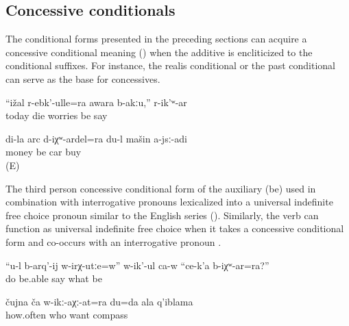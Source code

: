 
\subsection{Concessive conditionals}
\label{sec:concessiveconditionals}

The conditional forms presented in the preceding sections can acquire a concessive conditional meaning () when the additive is encliticized to the conditional suffixes. For instance, the realis conditional  or the past conditional  can serve as the base for concessives.
%
\begin{exe}
	\ex	\label{ex:‎‎‎Even if I die today, I am not worried, she said}
	\gll	``ižal	r-ebk'-ulle=ra	awara	b-akːu,''	r-ik'ʷ-ar\\
		today	die	worries	be	say\\
	\glt	{}

	\ex	\label{ex:‎‎Even if I had money, I would not buy a car}
	\gll	di-la	arc	d-iχʷ-ardel=ra		du-l	mašin	a-jsː-adi\\
			money	be		car	buy\\
	\glt	{} (E)
\end{exe}

The third person concessive conditional form of the auxiliary  (be) used in combination with interrogative pronouns lexicalized into a universal indefinite free choice pronoun similar to the English  series  (). Similarly, the verb   can function as universal indefinite free choice when it takes a concessive conditional form and co-occurs with an interrogative pronoun .
%
\begin{exe}
	\ex	\label{ex:Are you able to do whatever? he says}
	\gll	``u-l	b-arq'-ij	w-irχ-utːe=w''	w-ik'-ul	ca-w	``ce-k'a	b-iχʷ-ar=ra?''\\
			do	be.able	say		what		be\\
	\glt	{}

	\ex	\label{ex:How often whoever you love, I am your compass}
	\gll	čujna	ča	w-ikː-aχː-at=ra		du=da	ala	q'iblama\\
		how.often	who	want			compass\\
	\glt	{}
\end{exe}

